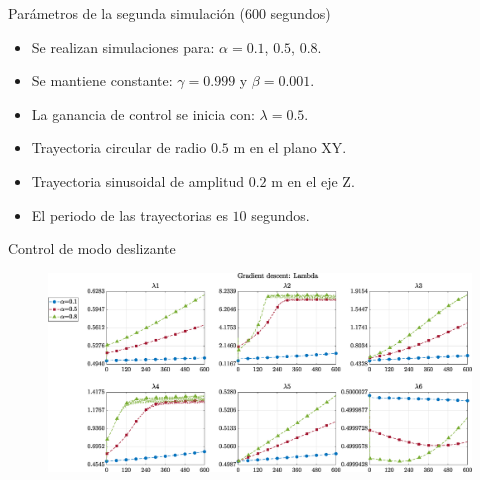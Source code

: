 \documentclass[10pt]{beamer} %
\begin{document}
	
	
	\begin{frame}[fragile]{Parámetros de la segunda simulación ($600$ segundos)}
		\begin{minipage}{\textwidth}
			\large {} 
			\begin{itemize}
				\item Se realizan simulaciones para: $\alpha=0.1$, $0.5$, $0.8$.
				
				\item Se mantiene constante: $\gamma=0.999$ y $\beta=0.001$.
				
				\item La ganancia de control se inicia con: $\lambda=0.5$.
			\end{itemize}
			\color{white}{para crear espacio, borrar luego}	 
		\end{minipage}
		
		\begin{minipage}{\textwidth}		
			\large {}
			\begin{itemize}
				\item Trayectoria circular de radio $0.5$ m en el plano XY.
				
				\item Trayectoria sinusoidal de amplitud $0.2$ m en el eje Z.
				
				\item El periodo de las trayectorias es $10$ segundos.
			\end{itemize}
		\end{minipage}		
	\end{frame}	
	
	\begin{frame}[fragile]{Control de modo deslizante}
		\begin{figure}
			\centering
			\hspace*{-0.5cm}\includegraphics[width=1.1\textwidth]{img/SMCi/circular_traj/600_seg/articular_SMCi_lambda_compare.eps}
		\end{figure}
	\end{frame}	
	
\end{document}
